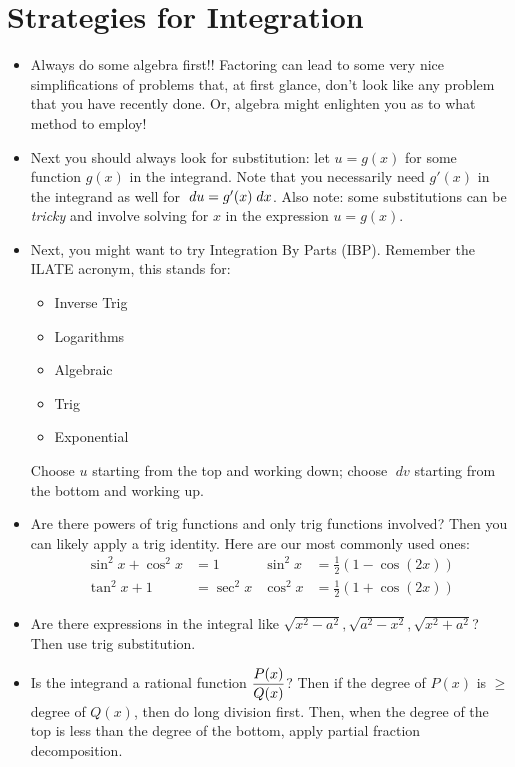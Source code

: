 \documentclass{ximera}
\newcommand{\du}{\; du}
\newcommand{\dv}{\; dv}
\begin{document}
\section{Strategies for Integration}
\begin{itemize}
	\item Always do some algebra first!! Factoring can lead to some very nice simplifications of problems that, at first glance, don't look like any problem that you have recently done. Or, algebra might enlighten you as to what method to employ!
	\item Next you should always look for substitution: let $u = g(x)$ for some function $g(x)$ in the integrand. Note that you necessarily need $g'(x)$ in the integrand as well for $\du = g'(x) \dx$. Also note: some substitutions can be \emph{tricky} and involve solving for $x$ in the expression $u=g(x)$.
	\item Next, you might want to try Integration By Parts (IBP). Remember the ILATE acronym, this stands for:
		\begin{itemize}
    		\item Inverse Trig
			\item Logarithms
			\item Algebraic
			\item Trig
			\item Exponential
		\end{itemize}
	Choose $u$ starting from the top and working down; choose $\dv$ starting from the bottom and working up.
	\item Are there powers of trig functions and only trig functions involved? Then you can likely apply a trig identity. Here are our most commonly used ones:
		\begin{align*}
			\sin^2 x + \cos^2 x &= 1 &\sin^2 x &= \frac{1}{2}\left(1-\cos(2x)\right) \\
			\tan^2 x + 1 &= \sec^2 x &\cos^2 x &= \frac{1}{2}\left(1 + \cos(2x) \right)
		\end{align*}

    \item Are there expressions in the integral like $\sqrt{x^2 - a^2}, \sqrt{a^2 - x^2}, \sqrt{x^2+a^2}$? Then use trig substitution.

	\item Is the integrand a rational function $\displaystyle\frac{P(x)}{Q(x)}$? Then if the degree of $P(x)$ is $\geq$ degree of $Q(x)$, then do long division first. Then, when the degree of the top is less than the degree of the bottom, apply partial fraction decomposition.
\end{itemize}
\end{document}
